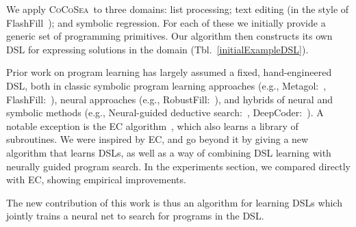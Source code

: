 \documentclass{article}
\newcommand{\system}{\textsc{CoCoSea}~}
\begin{document}
We apply \system to three domains:
list processing; text editing (in the style of FlashFill~\cite{gulwani2011automating}); and symbolic regression.
 For each of these we initially provide a generic
 set of programming primitives.
Our algorithm then constructs
its own DSL for expressing solutions in the domain (Tbl.~\ref{initialExampleDSL}).


Prior work on program learning has largely assumed a fixed, hand-engineered DSL,
both in classic symbolic program learning approaches (e.g., Metagol:~\cite{muggleton2015meta},
FlashFill:~\cite{gulwani2011automating}),
neural approaches  (e.g., RobustFill:~\cite{devlin2017robustfill}), and hybrids of neural and
symbolic methods (e.g., Neural-guided deductive search:~\cite{ngds}, DeepCoder:~\cite{balog2016deepcoder}).
A notable exception is the EC algorithm~\cite{Dechter:2013:BLV:2540128.2540316},
which also learns a library of subroutines.
We were inspired by EC,
and go beyond it by giving a new algorithm that learns DSLs, as well as a way of combining DSL learning with
neurally guided program search.
In the experiments section,
we compared directly with EC,
showing empirical improvements.

The new contribution of this work is
thus an  algorithm for learning DSLs which jointly trains a neural net to
search for programs in the DSL.


 


\end{document}
